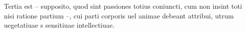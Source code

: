 \documentclass{article}
\begin{document}
\newcommand{\showwordrank}[2]{%
  #1\textsuperscript{#2}%
}

\begin{ledgroup}

\beginnumbering

\pstart
Tertia est – supposito, quod sint passiones totius coniuncti, cum non insint toti nisi ratione partium –, cui parti corporis uel animae debeant attribui,  utrum uegetatiuae  s  sensitiuae 
intellectiuae.


\pend

\endnumbering
\end{ledgroup}


\makeatother
\end{document}
